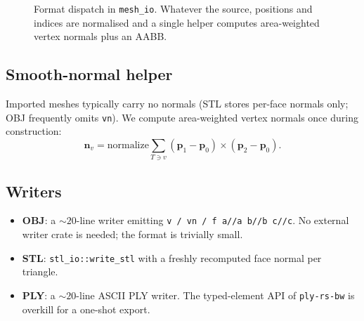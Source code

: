 \documentclass[11pt]{article}
\begin{document}
\begin{figure}[h]
\centering
{}
\caption{Format dispatch in \texttt{mesh\_io}.  Whatever the source,
positions and indices are normalised and a single helper computes
area-weighted vertex normals plus an AABB.}
\label{fig:io}
\end{figure}

\subsection{Smooth-normal helper}

Imported meshes typically carry no normals (STL stores per-face
normals only; OBJ frequently omits \texttt{vn}).  We compute
area-weighted vertex normals once during construction:
\[
  \mathbf{n}_v = \mathrm{normalize}\!\!\sum_{T\ni v}\!
                 (\mathbf{p}_1-\mathbf{p}_0)\times(\mathbf{p}_2-\mathbf{p}_0).
\]

\subsection{Writers}

\begin{itemize}[leftmargin=2em]
  \item \textbf{OBJ}: a $\sim 20$-line writer emitting
        \texttt{v / vn / f a//a b//b c//c}.  No external writer crate
        is needed; the format is trivially small.
  \item \textbf{STL}: \lstinline|stl_io::write_stl| with a freshly
        recomputed face normal per triangle.
  \item \textbf{PLY}: a $\sim 20$-line ASCII PLY writer.  The
        typed-element API of \texttt{ply-rs-bw} is overkill for a
        one-shot export.
\end{itemize}
\end{document}
